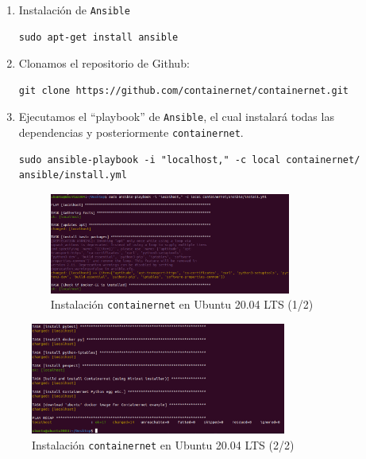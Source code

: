 \documentclass[12pt]{article}
\begin{document}
	\begin{enumerate}
		\item Instalación de \texttt{Ansible}
		\begin{verbatim}
sudo apt-get install ansible
		\end{verbatim}
	
		\item Clonamos el repositorio de Github:
		\begin{verbatim}
git clone https://github.com/containernet/containernet.git
		\end{verbatim}
	
		\item Ejecutamos el ``playbook'' de \texttt{Ansible}, el cual instalará todas las dependencias y posteriormente \texttt{containernet}.
		\begin{verbatim}
sudo ansible-playbook -i "localhost," -c local containernet/
ansible/install.yml
		\end{verbatim}
	
		\begin{figure}[h!]
			\begin{center}
				\includegraphics[width=0.75\textwidth]{img/cn_install1.png}
				\caption{Instalación \texttt{containernet} en Ubuntu 20.04 LTS (1/2)}	
			\end{center}
		\end{figure}
	\end{enumerate}
	
	\pagebreak
	
	\begin{figure}[h!]
		\begin{center}
			\includegraphics[width=0.75\textwidth]{img/cn_install2.png}
			\caption{Instalación \texttt{containernet} en Ubuntu 20.04 LTS (2/2)}
			\label{img: containernet install}
		\end{center}
	\end{figure}
	
\end{document}
